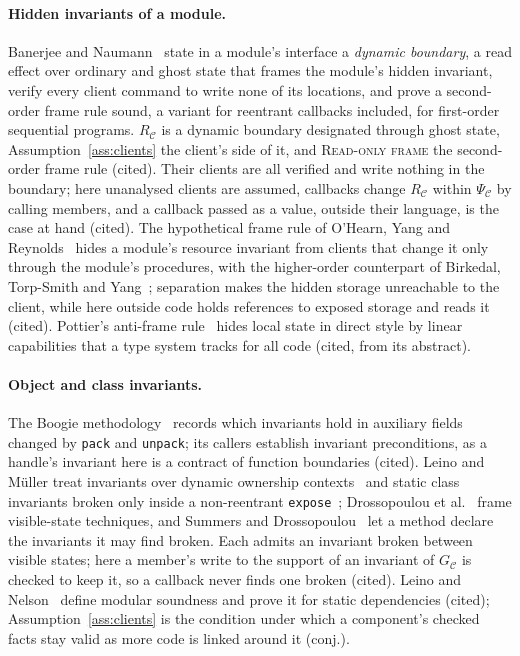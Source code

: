 \documentclass[10pt,a4paper]{article}
\theoremstyle{definition}
\theoremstyle{remark}
\newcommand{\code}[1]{\texttt{#1}}
\newcommand{\cC}{\mathcal{C}}
\begin{document}
\paragraph{Hidden invariants of a module.} Banerjee and Naumann~\cite{bn}
state in a module's interface a \emph{dynamic boundary}, a read effect
over ordinary and ghost state that frames the module's hidden invariant,
verify every client command to write none of its locations, and prove a
second-order frame rule sound, a variant for reentrant callbacks
included, for first-order sequential programs. $R_\cC$ is a dynamic
boundary designated through ghost state, Assumption~\ref{ass:clients}
the client's side of it, and \textsc{Read-only frame} the second-order
frame rule (cited). Their clients are all verified and write nothing in
the boundary; here unanalysed clients are assumed, callbacks change
$R_\cC$ within $\Psi_\cC$ by calling members, and a callback passed as a
value, outside their language, is the case at hand (cited). The
hypothetical frame rule of O'Hearn, Yang and Reynolds~\cite{oyr} hides a
module's resource invariant from clients that change it only through the
module's procedures, with the higher-order counterpart of Birkedal,
Torp-Smith and Yang~\cite{bty}; separation makes the hidden storage
unreachable to the client, while here outside code holds references to
exposed storage and reads it (cited). Pottier's anti-frame
rule~\cite{antiframe} hides local state in direct style by linear
capabilities that a type system tracks for all code (cited, from its
abstract).

\paragraph{Object and class invariants.} The Boogie
methodology~\cite{boogieinv} records which invariants hold in auxiliary
fields changed by \code{pack} and \code{unpack}; its callers establish
invariant preconditions, as a handle's invariant here is a contract of
function boundaries (cited). Leino and M\"uller treat invariants over
dynamic ownership contexts~\cite{lmdynamic} and static class invariants
broken only inside a non-reentrant \code{expose}~\cite{lmstatic};
Drossopoulou et al.~\cite{dfms} frame visible-state techniques, and
Summers and Drossopoulou~\cite{considerate} let a method declare the
invariants it may find broken. Each admits an invariant broken between
visible states; here a member's write to the support of an invariant of
$G_\cC$ is checked to keep it, so a callback never finds one broken
(cited). Leino and Nelson~\cite{leinonelson} define modular soundness and
prove it for static dependencies (cited); Assumption~\ref{ass:clients}
is the condition under which a component's checked facts stay valid as
more code is linked around it (conj.).
\end{document}

